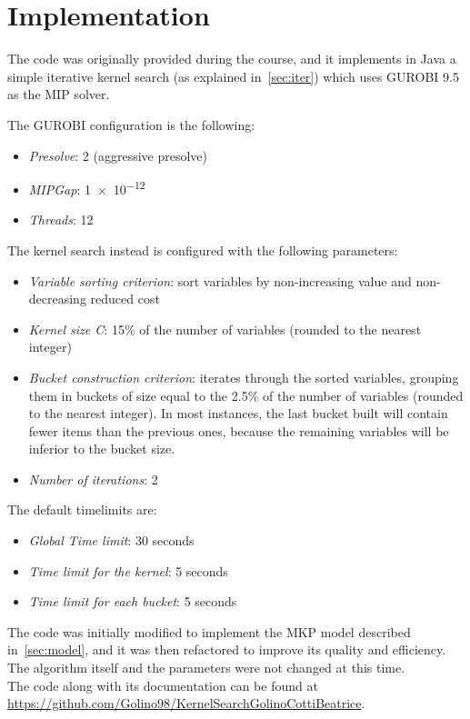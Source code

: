 \chapter{Implementation}

The code was originally provided during the course,
and it implements in Java a simple iterative kernel search (as explained in~\ref{sec:iter})
which uses GUROBI 9.5 as the MIP solver.

The GUROBI configuration is the following:
\begin{itemize}
    \item \textit{Presolve}: 2 (aggressive presolve)
    \item \textit{MIPGap}: \num{1e-12}
    \item \textit{Threads}: 12
\end{itemize}

The kernel search instead is configured with the following parameters:
\begin{itemize}
    \item \textit{Variable sorting criterion}: sort variables by non-increasing value and non-decreasing reduced cost
    \item \textit{Kernel size C}: 15\% of the number of variables (rounded to the nearest integer)
    \item \textit{Bucket construction criterion}: iterates through the sorted variables, grouping them in
    buckets of size equal to the 2.5\% of the number of variables (rounded to the nearest integer).
    In most instances, the last bucket built will contain fewer items than the previous ones, because the remaining
    variables will be inferior to the bucket size.
    \item \textit{Number of iterations}: 2
\end{itemize}

The default timelimits are:
\begin{itemize}
    \item \textit{Global Time limit}: 30 seconds
    \item \textit{Time limit for the kernel}: 5 seconds
    \item \textit{Time limit for each bucket}: 5 seconds
\end{itemize}

The code was initially modified to implement the MKP model described in~\ref{sec:model},
and it was then refactored to improve its quality and efficiency.
The algorithm itself and the parameters were not changed at this time.\\
The code along with its documentation can be found at
\url{https://github.com/Golino98/KernelSearchGolinoCottiBeatrice}.

